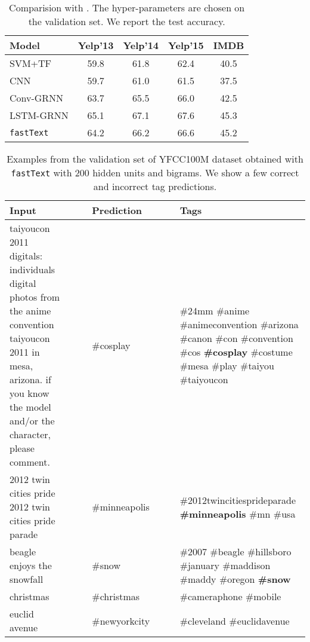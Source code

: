 \begin{table}[h]
\centering
\small
\begin{tabular}{@{\hspace{2pt}}l@{\hspace{2pt}}cccc}
\toprule
Model & Yelp'13 & Yelp'14 & Yelp'15 & IMDB \\
\midrule
SVM+TF & 59.8 & 61.8 & 62.4 & 40.5 \\
CNN & 59.7 & 61.0 & 61.5 & 37.5\\
Conv-GRNN & 63.7 & 65.5 & 66.0 & 42.5 \\
LSTM-GRNN & 65.1 & 67.1 & 67.6 & 45.3 \\
\midrule
\texttt{fastText}          & 64.2 & 66.2 & 66.6 & 45.2 \\
\bottomrule
\end{tabular}
\caption{Comparision with \protect{}. The hyper-parameters
are chosen on the validation set. We report the test accuracy.}\label{tab:tang_res}
\end{table}


\begin{table*}[t]
\centering
\small
\begin{tabular}{p{20em}clcp{15em}}
\toprule
Input &~~& Prediction &~~& Tags \\
\midrule
taiyoucon 2011 digitals: individuals digital photos from the anime convention
taiyoucon 2011 in mesa, arizona. if you know the model and/or the character,
please comment.
&&
{\#}cosplay
&&
{\#}24mm {\#}anime {\#}animeconvention {\#}arizona {\#}canon {\#}con {\#}convention {\#}cos \textbf{{\#}cosplay} {\#}costume {\#}mesa {\#}play {\#}taiyou {\#}taiyoucon
\\ 
\midrule[0.02em]
2012 twin cities pride 2012 twin cities pride parade
&&
{\#}minneapolis
&&
{\#}2012twincitiesprideparade \textbf{{\#}minneapolis} {\#}mn {\#}usa 
\\
\midrule[0.02em]
beagle enjoys the snowfall 
&&
{\#}snow
&&
{\#}2007 {\#}beagle {\#}hillsboro {\#}january {\#}maddison {\#}maddy {\#}oregon \textbf{{\#}snow} 
\\
\midrule[0.08em]
christmas && {\#}christmas && {\#}cameraphone {\#}mobile
\\
\midrule[0.02em]
euclid avenue && {\#}newyorkcity && {\#}cleveland {\#}euclidavenue 
\\
\bottomrule
\end{tabular}
\caption{Examples from the validation set of YFCC100M dataset obtained with \texttt{fastText}
with $200$ hidden units and bigrams. We show a few correct and incorrect tag predictions.
}\label{tab:tag_ex}
\end{table*}

